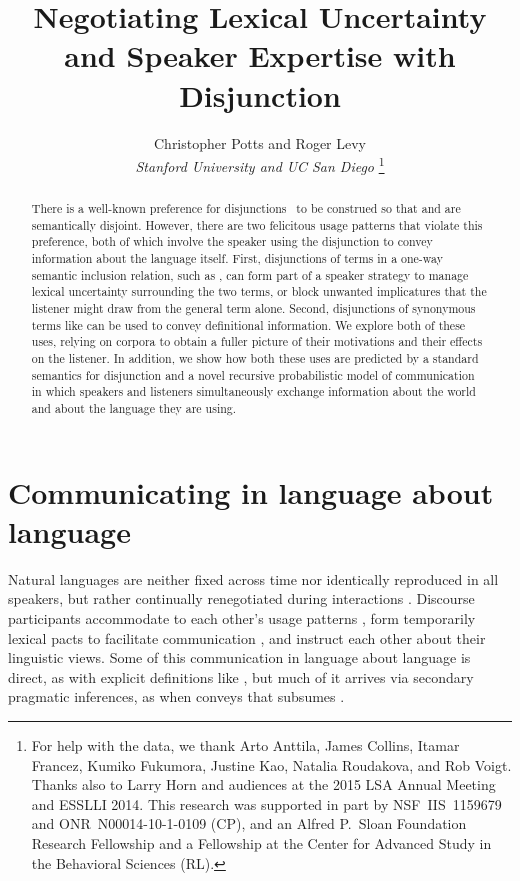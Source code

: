 \documentclass[12pt,twoside]{article}
\title{Negotiating Lexical Uncertainty and Speaker Expertise with Disjunction}				%
\author{\sc Christopher Potts and Roger Levy\\ 						%
{\it Stanford University and UC San Diego}%
\footnote{For help with the data, we thank Arto Anttila, James Collins, Itamar Francez, Kumiko Fukumora, Justine Kao, Natalia Roudakova, and Rob Voigt. 
Thanks also to Larry Horn and audiences at the 2015 LSA Annual Meeting and ESSLLI 2014. 
This research was supported in part by NSF~IIS~1159679 and ONR~N00014-10-1-0109 (CP), 
and an Alfred P.~Sloan Foundation Research Fellowship and a Fellowship at the Center for Advanced Study in the Behavioral Sciences (RL).}} %
\date{}
\renewcommand{\_}{\textbf{\textunderscore\hspace{-4pt}\textunderscore\hspace{-3pt}\textunderscore\hspace{-4pt}\textunderscore}\hspace{0.5pt}}			%
\begin{document}
\maketitle
\thispagestyle{empty}	

\newcommand{\XorY}{\word{X\,or\,Y}}
\newcommand{\AorX}{\word{A\,or\,X}}

\begin{abstract}
  There is a well-known preference for disjunctions \XorY\ to be
  construed so that  and  are semantically disjoint.
  However, there are two felicitous usage patterns that violate this
  preference, both of which involve the speaker using the disjunction
  to convey information about the language itself.  First,
  disjunctions of terms in a one-way semantic inclusion relation, such
  as , can form part of a speaker strategy to
  manage lexical uncertainty surrounding the two terms, or block
  unwanted implicatures that the listener might draw from the general
  term alone. Second, disjunctions of synonymous terms like  can be used to convey definitional
  information. We explore both of these uses, relying on corpora to
  obtain a fuller picture of their motivations and their effects on
  the listener. In addition, we show how both these uses are predicted
  by a standard semantics for disjunction and a novel recursive
  probabilistic model of communication in which speakers and listeners
  simultaneously exchange information about the world and about the
  language they are using.
\end{abstract}
			


\section{Communicating in language about language}\label{sec:introduction}

Natural languages are neither fixed across time nor identically
reproduced in all speakers, but rather continually renegotiated during
interactions \citep{Clark97}. Discourse participants accommodate to
each other's usage patterns \citep{Giles:Coupland:Coupland:1991}, form
temporarily lexical pacts to facilitate communication
\citep{Clark:Wilkes-Gibbs:1986,Brennan:Clark:1996}, and instruct each
other about their linguistic views. Some of this communication in
language about language is direct, as with explicit definitions like
, but much of it arrives via
secondary pragmatic inferences, as when  conveys
that  subsumes  \citep{Hearst92,SnowEtAl05}.
\end{document}
